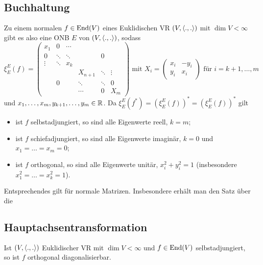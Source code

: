 \subsection{Buchhaltung}
	Zu einem normalen $ f\in \operatorname{End}(V) $ eines Euklidischen VR $ (V,\langle .,. \rangle) $ mit $ \dim V < \infty $
	gibt es also eine ONB $ E $ von $ (V,\langle .,. \rangle) $, sodass 
		\[ \xi_E^E(f) = \begin{pmatrix}
		x_1& 0&\cdots & & &\\
		0 & \ddots & \ddots& & 0& \\
		\vdots & \ddots & x_k& & &\\
		& & & X_{n+1} & \ddots & \vdots\\
		&0 & & \ddots & \ddots & 0\\
		& & & \cdots&0 & X_m
		\end{pmatrix}
		\text{ mit } X_i = \begin{pmatrix}
		x_i & -y_i\\ y_i & x_i
		\end{pmatrix} \text{ für } i=k+1,\dots,m \]
	und $ x_1,\dots,x_m,y_{k+1},\dots,y_m\in \mathbb{R} $. Da $ \xi_E^E(f^*) = (\xi_E^E(f))^* = (\xi_E^E(f))^* $ gilt
		\begin{itemize}
			\item ist $ f $ selbstadjungiert, so sind alle Eigenwerte reell, $ k=m $;
			\item ist $ f $ schiefadjungiert, so sind alle Eigenwerte imaginär, $ k=0 $ und $ x_1=\dots=x_m=0 $;
			\item ist $ f $ orthogonal, so sind alle Eigenwerte unitär, $ x_i^2+y_i^2=1 $ (insbesondere $ x_1^2=\dots=x_k^2=1 $).
		\end{itemize}
	Entsprechendes gilt für normale Matrizen. Insbesondere erhält man den Satz über die
\subsection{Hauptachsentransformation}
\begin{Satz}[Hauptachsentransformation]
	Ist $ (V,\langle .,. \rangle) $ Euklidischer VR mit $ \dim V<\infty $ und $ f\in \operatorname{End}(V) $ selbstadjungiert, so ist $ f $ orthogonal diagonalisierbar.
\end{Satz}
